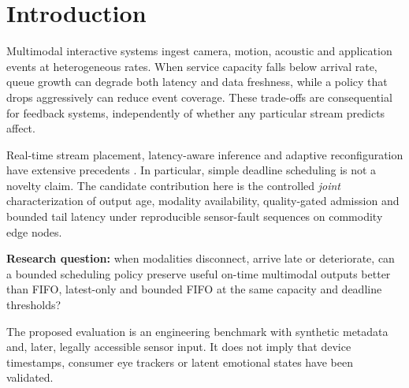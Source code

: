 \section{Introduction}
Multimodal interactive systems ingest camera, motion, acoustic and application events at heterogeneous rates. When service capacity falls below arrival rate, queue growth can degrade both latency and data freshness, while a policy that drops aggressively can reduce event coverage. These trade-offs are consequential for feedback systems, independently of whether any particular stream predicts affect.

Real-time stream placement, latency-aware inference and adaptive reconfiguration have extensive precedents \cite{nigade2024,sedlak2025,beaver2024,dynamicbatch2024}. In particular, simple deadline scheduling is not a novelty claim. The candidate contribution here is the controlled \emph{joint} characterization of output age, modality availability, quality-gated admission and bounded tail latency under reproducible sensor-fault sequences on commodity edge nodes.

\textbf{Research question:} when modalities disconnect, arrive late or deteriorate, can a bounded scheduling policy preserve useful on-time multimodal outputs better than FIFO, latest-only and bounded FIFO at the same capacity and deadline thresholds?

The proposed evaluation is an engineering benchmark with synthetic metadata and, later, legally accessible sensor input. It does not imply that device timestamps, consumer eye trackers or latent emotional states have been validated.
